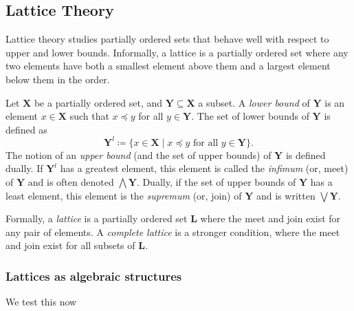 \subsection{Lattice Theory}
\label{subsection:lattice-theory}

Lattice theory studies partially ordered sets that behave well with respect to upper and lower bounds. Informally, a lattice is a partially ordered set where any two elements have both a smallest element above them and a largest element below them in the order.

\begin{definition}
  \label{definition:infimum-supremum}
  Let $\mathbf{X}$ be a partially ordered set, and $\mathbf{Y} \subseteq \mathbf{X}$ a subset. A \textit{lower bound} of $\mathbf{Y}$ is an element $x \in \mathbf{X}$ such that $x \preceq y$ for all $y \in \mathbf{Y}$. The set of lower bounds of $\mathbf{Y}$ is defined as
  \[
    \mathbf{Y}^l \coloneqq \{x \in \mathbf{X} \mid x \preceq y \text{ for all } y \in \mathbf{Y}\}.
  \]
  The notion of an \textit{upper bound} (and the set of upper bounds) of $\mathbf{Y}$ is defined dually. If $\mathbf{Y}^l$ has a greatest element, this element is called the \textit{infimum} (or, meet) of $\mathbf{Y}$ and is often denoted $\bigwedge \mathbf{Y}$. Dually, if the set of upper bounds of $\mathbf{Y}$ has a least element, this element is the \textit{supremum} (or, join) of $\mathbf{Y}$ and is written $\bigvee \mathbf{Y}$.
   
\end{definition}

Formally, a \textit{lattice} is a partially ordered set $\mathbf{L}$ where the meet and join exist for any pair of elements. A \textit{complete lattice} is a stronger condition, where the meet and join exist for all subsets of $\mathbf{L}$.  


\subsubsection{Lattices as algebraic structures}
\label{subsubsection:lattices-as-algebraic-structures}
We test this now

